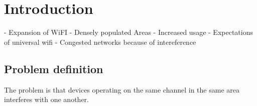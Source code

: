\documentclass[a4paper,UKenglish]{report}
\begin{document}


\chapter{Introduction}
- Expansion of WiFI
- Densely populated Areas
- Increased usage
- Expectations of universal wifi
- Congested networks because of intereference

\section{Problem definition}
The problem is that devices operating on the same channel in the same area interferes with one another.
\end{document}
